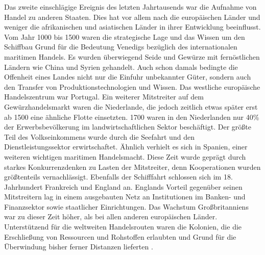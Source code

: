 Das zweite einschlägige Ereignis des letzten Jahrtausends war die Aufnahme von Handel zu anderen Staaten. Dies hat vor allem nach \citet{Maddison.2001} die europäischen Länder und weniger die afrikanischen und asiatischen Länder in ihrer Entwicklung  beeinflusst. Vom Jahr 1000 bis 1500 waren die strategische Lage und das Wissen um den Schiffbau Grund für die Bedeutung Venedigs bezüglich des internationalen maritimen Handels. Es wurden überwiegend Seide und Gewürze mit fernöstlichen Ländern wie China und Syrien gehandelt. Auch schon damals bedingte die Offenheit eines Landes nicht nur die Einfuhr unbekannter Güter, sondern auch den Transfer von Produktionstechnologien und Wissen. Das westliche europäische Handelszentrum war Portugal. Ein weiterer Mitstreiter auf dem Gewürzhandelsmarkt waren die Niederlande, die jedoch zeitlich etwas später erst ab 1500 eine ähnliche Flotte einsetzten. 1700 waren in den Niederlanden nur 40{\%}  der Erwerbsbevölkerung im landwirtschaftlichen Sektor beschäftigt. Der größte Teil des Volkseinkommens wurde durch die Seefahrt und den Dienstleistungssektor erwirtschaftet. Ähnlich verhielt es sich in Spanien, einer weiteren wichtigen maritimen Handelsmacht. Diese Zeit wurde geprägt durch starkes Konkurrenzdenken zu Lasten der Mitstreiter, denn Kooperationen wurden größtenteils vernachlässigt. Ebenfalls der Schifffahrt schlossen sich im 18. Jahrhundert Frankreich und England an. Englands Vorteil gegenüber seinen Mitstreitern lag in einem ausgebauten Netz an Institutionen im Banken- und Finanzsektor sowie staatlicher Einrichtungen. Das Wachstum Großbritanniens war zu dieser Zeit höher, als bei allen anderen europäischen Länder. Unterstützend für die weltweiten Handelsrouten waren die Kolonien, die  die Erschließung von Ressourcen und Rohstoffen erlaubten und Grund für die Überwindung bisher ferner Distanzen lieferten \citep{Maddison.2001}.
